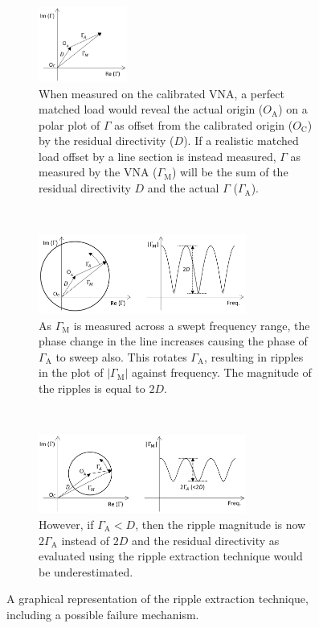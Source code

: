 \documentclass[../thesis/thesis.tex]{subfiles}
\begin{document}
\begin{figure}
	\centering
	\begin{subfigure}{\textwidth}
		\centering
		\includegraphics[width=0.32\textwidth]{Ripple1.png}
		\caption{When measured on the calibrated VNA, a perfect matched load would reveal the actual origin ($O_\textrm{A}$) on a polar plot of $\Gamma$ as offset from the calibrated origin ($O_\textrm{C}$) by the residual directivity ($D$). If a realistic matched load offset by a line section is instead measured, $\Gamma$ as measured by the VNA ($\Gamma_\textrm{M}$) will be the sum of the residual directivity $D$ and the actual $\Gamma$ ($\Gamma_\textrm{A}$). }
	\end{subfigure}
	\\
	\begin{subfigure}{\textwidth}
		\centering
		\includegraphics[width=0.75\textwidth]{Ripple2.png}
		\caption{As $\Gamma_\textrm{M}$ is measured across a swept frequency range, the phase change in the line increases causing the phase of $\Gamma_\textrm{A}$ to sweep also. This rotates $\Gamma_\textrm{A}$, resulting in ripples in the plot of $|\Gamma_\textrm{M}|$ against frequency. The magnitude of the ripples is equal to $2D$. }
	\end{subfigure}
	\\
	\begin{subfigure}{\textwidth}
		\centering
		\includegraphics[width=0.75\textwidth]{Ripple3.png}
		\caption{However, if $\Gamma_\textrm{A} < D$, then the ripple magnitude is now $2\Gamma_\textrm{A}$ instead of $2D$ and the residual directivity as evaluated using the ripple extraction technique would be underestimated.}
	\end{subfigure}
	\caption{A graphical representation of the ripple extraction technique, including a possible failure mechanism.}
	\label{ch4_fig_ripple1}
\end{figure}
\end{document}
